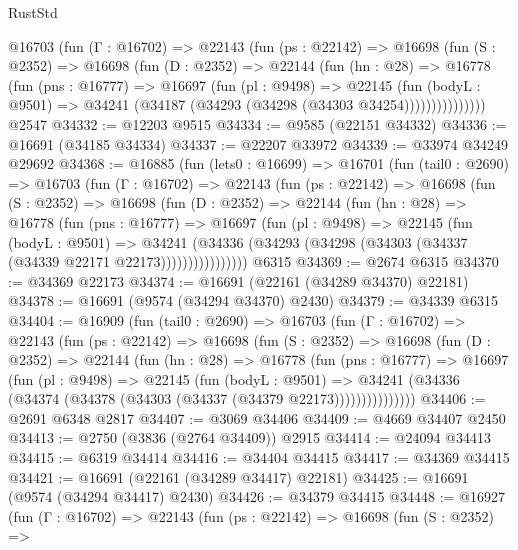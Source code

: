 \begin{lexlean}{RustStd}
\begin{coremodule}
        @16703
          (fun (Γ : @16702) =>
          @22143
            (fun (ps : @22142) =>
            @16698
              (fun (S : @2352) =>
              @16698
                (fun (D : @2352) =>
                @22144
                  (fun (hn : @28) =>
                  @16778
                    (fun (pns : @16777) =>
                    @16697
                      (fun (pl : @9498) =>
                      @22145
                        (fun (bodyL : @9501) =>
                        @34241 (@34187 (@34293 (@34298 (@34303 @34254)))))))))))))))
    @2547
@34332 := @12203 @9515
@34334 := @9585 (@22151 @34332)
@34336 := @16691 (@34185 @34334)
@34337 := @22207 @33972
@34339 := @33974 @34249 @29692
@34368 := @16885
    (fun (lets0 : @16699) =>
    @16701
      (fun (tail0 : @2690) =>
      @16703
        (fun (Γ : @16702) =>
        @22143
          (fun (ps : @22142) =>
          @16698
            (fun (S : @2352) =>
            @16698
              (fun (D : @2352) =>
              @22144
                (fun (hn : @28) =>
                @16778
                  (fun (pns : @16777) =>
                  @16697
                    (fun (pl : @9498) =>
                    @22145
                      (fun (bodyL : @9501) =>
                      @34241
                        (@34336
                          (@34293 (@34298 (@34303 (@34337 (@34339 @22171 @22173))))))))))))))))
    @6315
@34369 := @2674 @6315
@34370 := @34369 @22173
@34374 := @16691 (@22161 (@34289 @34370) @22181)
@34378 := @16691 (@9574 (@34294 @34370) @2430)
@34379 := @34339 @6315
@34404 := @16909
    (fun (tail0 : @2690) =>
    @16703
      (fun (Γ : @16702) =>
      @22143
        (fun (ps : @22142) =>
        @16698
          (fun (S : @2352) =>
          @16698
            (fun (D : @2352) =>
            @22144
              (fun (hn : @28) =>
              @16778
                (fun (pns : @16777) =>
                @16697
                  (fun (pl : @9498) =>
                  @22145
                    (fun (bodyL : @9501) =>
                    @34241 (@34336 (@34374 (@34378 (@34303 (@34337 (@34379 @22173)))))))))))))))
@34406 := @2691 @6348 @2817
@34407 := @3069 @34406
@34409 := @4669 @34407 @2450
@34413 := @2750 (@3836 (@2764 @34409)) @2915
@34414 := @24094 @34413
@34415 := @6319 @34414
@34416 := @34404 @34415
@34417 := @34369 @34415
@34421 := @16691 (@22161 (@34289 @34417) @22181)
@34425 := @16691 (@9574 (@34294 @34417) @2430)
@34426 := @34379 @34415
@34448 := @16927
    (fun (Γ : @16702) =>
    @22143
      (fun (ps : @22142) =>
      @16698
        (fun (S : @2352) =>

\end{coremodule}
\end{lexlean}
